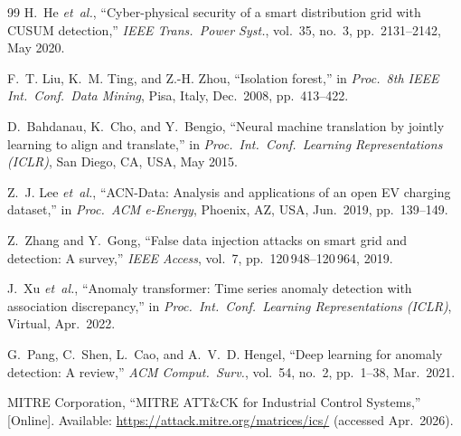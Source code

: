 \documentclass[journal]{IEEEtran}
\begin{document}
\begin{thebibliography}{99}
H.~He \emph{et~al.},
``Cyber-physical security of a smart distribution grid with
CUSUM detection,''
\emph{IEEE Trans.\ Power Syst.},
vol.~35, no.~3, pp.~2131--2142, May 2020.

F.~T. Liu, K.~M. Ting, and Z.-H. Zhou,
``Isolation forest,''
in \emph{Proc.\ 8th IEEE Int.\ Conf.\ Data Mining},
Pisa, Italy, Dec.~2008, pp.~413--422.

D.~Bahdanau, K.~Cho, and Y.~Bengio,
``Neural machine translation by jointly learning to align
and translate,''
in \emph{Proc.\ Int.\ Conf.\ Learning Representations (ICLR)},
San Diego, CA, USA, May 2015.

Z.~J. Lee \emph{et~al.},
``ACN-Data: Analysis and applications of an open EV charging
dataset,''
in \emph{Proc.\ ACM e-Energy},
Phoenix, AZ, USA, Jun.~2019, pp.~139--149.

Z.~Zhang and Y.~Gong,
``False data injection attacks on smart grid and detection:
A survey,''
\emph{IEEE Access},
vol.~7, pp.~120\,948--120\,964, 2019.

J.~Xu \emph{et~al.},
``Anomaly transformer: Time series anomaly detection with
association discrepancy,''
in \emph{Proc.\ Int.\ Conf.\ Learning Representations (ICLR)},
Virtual, Apr.~2022.

G.~Pang, C.~Shen, L.~Cao, and A.~V.~D. Hengel,
``Deep learning for anomaly detection: A review,''
\emph{ACM Comput.\ Surv.},
vol.~54, no.~2, pp.~1--38, Mar.~2021.

MITRE Corporation,
``MITRE ATT\&CK for Industrial Control Systems,''
[Online]. Available: \url{https://attack.mitre.org/matrices/ics/}
(accessed Apr.~2026).

\end{thebibliography}
\end{document}
